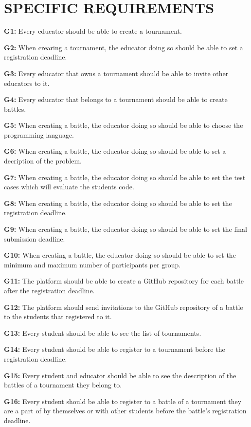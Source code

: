 \documentclass{article}
\begin{document}
\section{SPECIFIC REQUIREMENTS}
\iffalse
    \item \textbf{G1:} Every educator should be able to create a tournament.
    \item \textbf{G2:} When crearing a tournament, the educator doing so should be able to set a registration deadline.
    \item \textbf{G3:} Every educator that owns a tournament should be able to invite other educators to it.
    \item \textbf{G4:} Every educator that belongs to a tournament should be able to create battles.
    \item \textbf{G5:} When creating a battle, the educator doing so should be able to choose the programming language.
    \item \textbf{G6:} When creating a battle, the educator doing so should be able to set a decription of the problem.
    \item \textbf{G7:} When creating a battle, the educator doing so should be able to set the test cases which will evaluate the students code.
    \item \textbf{G8:} When creating a battle, the educator doing so should be able to set the registration deadline.
    \item \textbf{G9:} When creating a battle, the educator doing so should be able to set the final submission deadline.
    \item \textbf{G10:} When creating a battle, the educator doing so should be able to set the minimum and maximum number of participants per group.
    \item \textbf{G11:} The platform should be able to create a GitHub repository for each battle after the registration deadline.
    \item \textbf{G12:} The platform should send invitations to the GitHub repository of a battle to the students that registered to it.
    \item \textbf{G13:} Every student should be able to see the list of tournaments.
    \item \textbf{G14:} Every student should be able to register to a tournament before the registration deadline.
    \item \textbf{G15:} Every student and educator should be able to see the description of the battles of a tournament they belong to.
    \item \textbf{G16:} Every student should be able to register to a battle of a tournament they are a part of by themselves or with other students before the battle's registration deadline.
\end{document}
